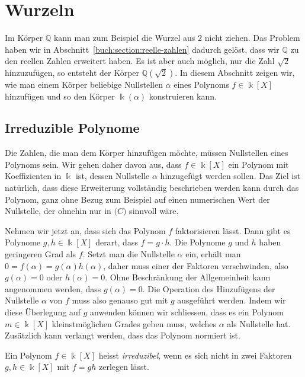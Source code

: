 %
%
%
\section{Wurzeln
\label{buch:section:wurzeln}}
Im Körper $\mathbb{Q}$ kann man zum Beispiel die Wurzel aus $2$ nicht 
ziehen.
Das Problem haben wir in Abschnitt~\ref{buch:section:reelle-zahlen}
dadurch gelöst, dass wir $\mathbb{Q}$ zu den reellen Zahlen
erweitert haben.
Es ist aber auch möglich, nur die Zahl $\sqrt{2}$ hinzuzufügen,
so entsteht der Körper $\mathbb{Q}(\sqrt{2})$.
In diesem Abschnitt zeigen wir, wie man einem Körper beliebige 
Nullstellen $\alpha$ eines Polynoms $f\in\Bbbk[X]$ hinzufügen und
so den Körper $\Bbbk(\alpha)$ konstruieren kann.

\subsection{Irreduzible Polynome
\label{buch:subsection:irreduziblepolynome}}
Die Zahlen, die man dem Körper hinzufügen möchte, müssen Nullstellen
eines Polynoms sein.
Wir gehen daher davon aus, dass $f\in \Bbbk[X]$ ein Polynom mit
Koeffizienten in $\Bbbk$ ist, dessen Nullstelle $\alpha$ hinzugefügt
werden sollen.
Das Ziel ist natürlich, dass diese Erweiterung vollständig beschrieben
werden kann durch das Polynom, ganz ohne Bezug zum Beispiel auf einen
numerischen Wert der Nullstelle, der ohnehin nur in $\mathbb(C)$ sinnvoll
wäre.

Nehmen wir jetzt an, dass sich das Polynom $f$ faktorisieren lässt.
Dann gibt es Polynome $g,h\in\Bbbk[X]$ derart, dass $f=g\cdot h$.
Die Polynome $g$ und $h$ haben geringeren Grad als $f$. 
Setzt man die Nullstelle $\alpha$ ein, erhält man
$0=f(\alpha)=g(\alpha)h(\alpha)$, daher muss einer der Faktoren
verschwinden, also $g(\alpha)=0$ oder $h(\alpha)=0$.
Ohne Beschränkung der Allgemeinheit kann angenommen werden, dass
$g(\alpha)=0$.
Die Operation des Hinzufügens der Nullstelle $\alpha$ von $f$
muss also genauso gut mit $g$ ausgeführt werden.
Indem wir diese Überlegung auf $g$ anwenden können wir schliessen,
dass es ein Polynom $m\in\Bbbk[X]$ kleinstmöglichen Grades geben muss,
welches $\alpha$ als Nullstelle hat.
Zusätzlich kann verlangt werden, dass das Polynom normiert ist.

\begin{definition}
Ein Polynom $f\in \Bbbk[X]$ heisst {\em irreduzibel}, wenn es sich nicht
in zwei Faktoren $g,h\in \Bbbk[X]$ mit $f=gh$ zerlegen lässt.
%
\end{definition}

